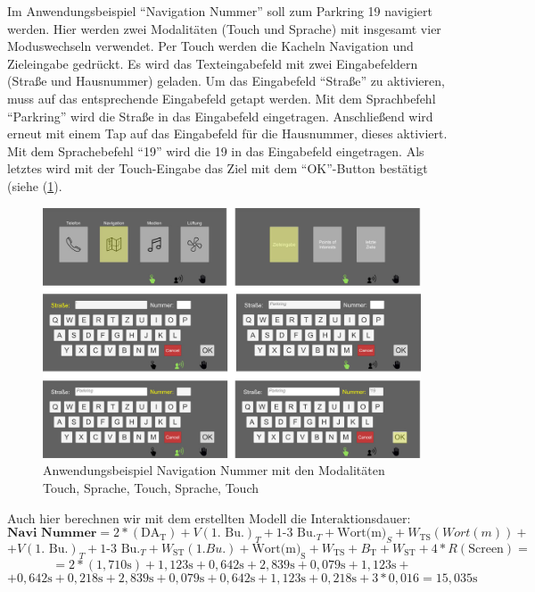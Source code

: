 Im Anwendungsbeispiel "`Navigation Nummer"' soll zum Parkring 19 navigiert werden. 
Hier werden zwei Modalitäten (Touch und Sprache) mit insgesamt vier Moduswechseln verwendet. 
Per Touch werden die Kacheln Navigation und Zieleingabe gedrückt. 
Es wird das Texteingabefeld mit zwei Eingabefeldern (Straße und Hausnummer) geladen. 
Um das Eingabefeld "`Straße"' zu aktivieren, muss auf das entsprechende Eingabefeld getapt werden. 
Mit dem Sprachbefehl "`Parkring"' wird die Straße in das Eingabefeld eingetragen. 
Anschließend wird erneut mit einem Tap auf das Eingabefeld für die Hausnummer, dieses aktiviert. 
Mit dem Sprachebefehl "`19"' wird die 19 in das Eingabefeld eingetragen. 
Als letztes wird mit der Touch-Eingabe das Ziel mit dem "`OK"'-Button bestätigt (siehe (\ref{fig:UseCasesEvalNaviNummer}).
\begin{figure}[ht]
	\centering
		\includegraphics[width=1\textwidth]{img/UseCases_Eval_Navi_Nummer.jpg}
	\caption{Anwendungsbeispiel Navigation Nummer mit den Modalitäten Touch, Sprache, Touch, Sprache, Touch}
	\label{fig:UseCasesEvalNaviNummer}
\end{figure}	
Auch hier berechnen wir mit dem erstellten Modell die Interaktionsdauer:
\[
\textbf{Navi Nummer} = 2*(\text{DA}_\text{T}) + V(\text{1. Bu.})_T + \text{1-3 Bu.}_T + \text{Wort(m)}_S + W_\text{TS}(Wort(m)) +
\]
\[
+ V(\text{1. Bu.})_T + \text{1-3 Bu.}_T + W_\text{ST}(1. Bu.) + \text{Wort(m)}_\text{S} + W_\text{TS} + B_\text{T} + W_\text{ST} + 4*R(\text{Screen}) =
\]
\[
= 2*( 1,710\text{s}) +  1,123\text{s} + 0,642\text{s} + 2,839\text{s} + 0,079\text{s} + 1,123\text{s} + 
\]
\[
+ 0,642\text{s} + 0,218\text{s} + 2,839\text{s} + 0,079\text{s} + 0,642\text{s} + 1,123\text{s} + 0,218\text{s} + 3*0,016 = 15,035\text{s}
\]

